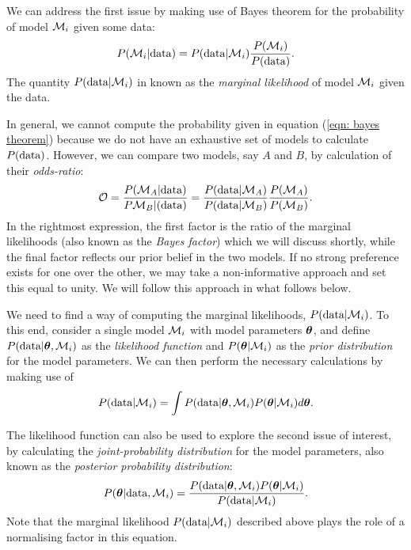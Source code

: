 \documentclass[../full_thesis/full_thesis.tex]{subfiles}
\begin{document}
We can address the first issue by making use of Bayes theorem for the
probability of model $\mathcal{M}_{i}$ given some data:
\begin{equation}
    P(\mathcal{M}_{i} | \textrm{data}) = P(\textrm{data} | \mathcal{M}_{i}) \frac{P(\mathcal{M}_{i})}{P(\textrm{data})}.
\label{eqn: bayes theorem}
\end{equation}
The quantity $P(\textrm{data} | \mathcal{M}_{i})$ in known as the \emph{marginal likelihood} of
model $\mathcal{M}_i$ given the data.

In general, we cannot compute the probability given in equation (\ref{eqn: bayes
theorem})  because we do not have an exhaustive set of models to calculate
$P(\textrm{data})$.  However, we can compare two models, say $A$ and $B$, by
calculation of their \emph{odds-ratio}:
\begin{equation}
\mathcal{O} = \frac{P(\mathcal{M}_{A}|\textrm{data})}{P\mathcal{M}_{B}|(\textrm{data})}=
            \frac{P(\textrm{data}|\mathcal{M}_{A})}{P(\textrm{data}|\mathcal{M}_{B})}
            \frac{P(\mathcal{M}_{A})}{P(\mathcal{M}_{B})}.
\label{eqn: odds-ratio}
\end{equation}
In the rightmost expression, the first factor is the ratio of the marginal
likelihoods (also known as the \emph{Bayes factor}) which we will discuss
shortly, while the final factor reflects our prior belief in the two models. If
no strong preference exists for one over the other, we may take a
non-informative approach and set this equal to unity.  We will follow this
approach in what follows below.

We need to find a way of computing the marginal likelihoods, $P(\textrm{data} |
\mathcal{M}_{i})$.  To this end, consider a single model  $\mathcal{M}_{i}$ with model parameters
$\boldsymbol{\theta}$, and define $P(\textrm{data}| \boldsymbol{\theta}, \mathcal{M}_{i})$ as the \emph{likelihood
function} and $P(\boldsymbol{\theta} | \mathcal{M}_{i})$ as the \emph{prior distribution} for the
model parameters.   We can then perform the necessary calculations by making
use of
\begin{equation}
    P(\textrm{data}|\mathcal{M}_{i}) = \int
                      P(\textrm{data}| \boldsymbol{\theta}, \mathcal{M}_{i})P(\boldsymbol{\theta} | \mathcal{M}_{i})
                      d\boldsymbol{\theta}.
\label{eqn: marginal likelihood}
\end{equation}

The likelihood function can also be used to explore the second issue of
interest, by calculating the \emph{joint-probability distribution} for the
model parameters, also known as the \emph{posterior probability distribution}:
\begin{align}
P(\boldsymbol{\theta}| \textrm{data}, \mathcal{M}_{i}) =
\frac{P(\textrm{data}| \boldsymbol{\theta}, \mathcal{M}_{i})P(\boldsymbol{\theta} | \mathcal{M}_{i})}
{P(\textrm{data}| \mathcal{M}_{i})}.
\end{align}
Note that the marginal likelihood $P(\textrm{data}| \mathcal{M}_{i})$ described above plays the
role of a normalising factor in this equation.
\end{document}
